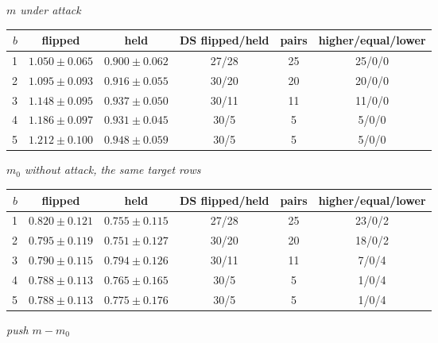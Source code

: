 \par\medskip\noindent\textit{$m$ under attack}\par\nopagebreak
\centering\scriptsize\begin{tabular}{@{}rccccc@{}}\toprule
$b$ & flipped & held & DS flipped/held & pairs & higher/equal/lower \\ \midrule
1 & $1.050 \pm 0.065$ & $0.900 \pm 0.062$ & 27/28 & 25 & 25/0/0 \\
2 & $1.095 \pm 0.093$ & $0.916 \pm 0.055$ & 30/20 & 20 & 20/0/0 \\
3 & $1.148 \pm 0.095$ & $0.937 \pm 0.050$ & 30/11 & 11 & 11/0/0 \\
4 & $1.186 \pm 0.097$ & $0.931 \pm 0.045$ & 30/5 & 5 & 5/0/0 \\
5 & $1.212 \pm 0.100$ & $0.948 \pm 0.059$ & 30/5 & 5 & 5/0/0 \\
\bottomrule\end{tabular}

\par\medskip\noindent\textit{$m_0$ without attack, the same target rows}\par\nopagebreak
\centering\scriptsize\begin{tabular}{@{}rccccc@{}}\toprule
$b$ & flipped & held & DS flipped/held & pairs & higher/equal/lower \\ \midrule
1 & $0.820 \pm 0.121$ & $0.755 \pm 0.115$ & 27/28 & 25 & 23/0/2 \\
2 & $0.795 \pm 0.119$ & $0.751 \pm 0.127$ & 30/20 & 20 & 18/0/2 \\
3 & $0.790 \pm 0.115$ & $0.794 \pm 0.126$ & 30/11 & 11 & 7/0/4 \\
4 & $0.788 \pm 0.113$ & $0.765 \pm 0.165$ & 30/5 & 5 & 1/0/4 \\
5 & $0.788 \pm 0.113$ & $0.775 \pm 0.176$ & 30/5 & 5 & 1/0/4 \\
\bottomrule\end{tabular}

\par\medskip\noindent\textit{push $m - m_0$}\par\nopagebreak
\centering\scriptsize{}
